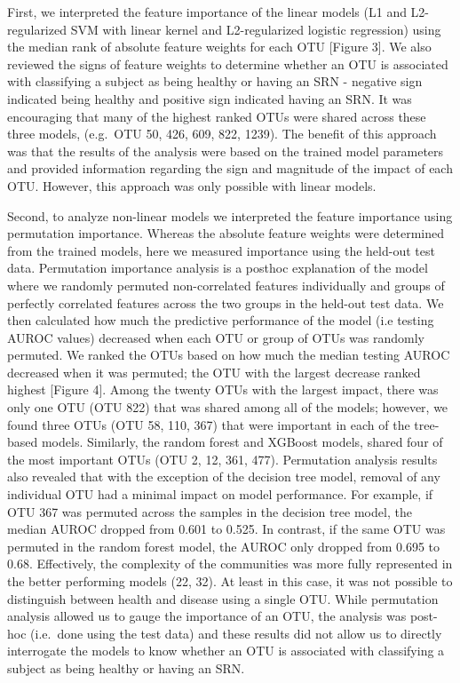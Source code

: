 \documentclass[11pt,]{article}
\begin{document}
First, we interpreted the feature importance of the linear models (L1
and L2-regularized SVM with linear kernel and L2-regularized logistic
regression) using the median rank of absolute feature weights for each
OTU {[}Figure 3{]}. We also reviewed the signs of feature weights to
determine whether an OTU is associated with classifying a subject as
being healthy or having an SRN - negative sign indicated being healthy
and positive sign indicated having an SRN. It was encouraging that many
of the highest ranked OTUs were shared across these three models,
(e.g.~OTU 50, 426, 609, 822, 1239). The benefit of this approach was
that the results of the analysis were based on the trained model
parameters and provided information regarding the sign and magnitude of
the impact of each OTU. However, this approach was only possible with
linear models.

Second, to analyze non-linear models we interpreted the feature
importance using permutation importance. Whereas the absolute feature
weights were determined from the trained models, here we measured
importance using the held-out test data. Permutation importance analysis
is a posthoc explanation of the model where we randomly permuted
non-correlated features individually and groups of perfectly correlated
features across the two groups in the held-out test data. We then
calculated how much the predictive performance of the model (i.e testing
AUROC values) decreased when each OTU or group of OTUs was randomly
permuted. We ranked the OTUs based on how much the median testing AUROC
decreased when it was permuted; the OTU with the largest decrease ranked
highest {[}Figure 4{]}. Among the twenty OTUs with the largest impact,
there was only one OTU (OTU 822) that was shared among all of the
models; however, we found three OTUs (OTU 58, 110, 367) that were
important in each of the tree-based models. Similarly, the random forest
and XGBoost models, shared four of the most important OTUs (OTU 2, 12,
361, 477). Permutation analysis results also revealed that with the
exception of the decision tree model, removal of any individual OTU had
a minimal impact on model performance. For example, if OTU 367 was
permuted across the samples in the decision tree model, the median AUROC
dropped from 0.601 to 0.525. In contrast, if the same OTU was permuted
in the random forest model, the AUROC only dropped from 0.695 to 0.68.
Effectively, the complexity of the communities was more fully
represented in the better performing models (22, 32). At least in this
case, it was not possible to distinguish between health and disease
using a single OTU. While permutation analysis allowed us to gauge the
importance of an OTU, the analysis was post-hoc (i.e.~done using the
test data) and these results did not allow us to directly interrogate
the models to know whether an OTU is associated with classifying a
subject as being healthy or having an SRN.
\end{document}
